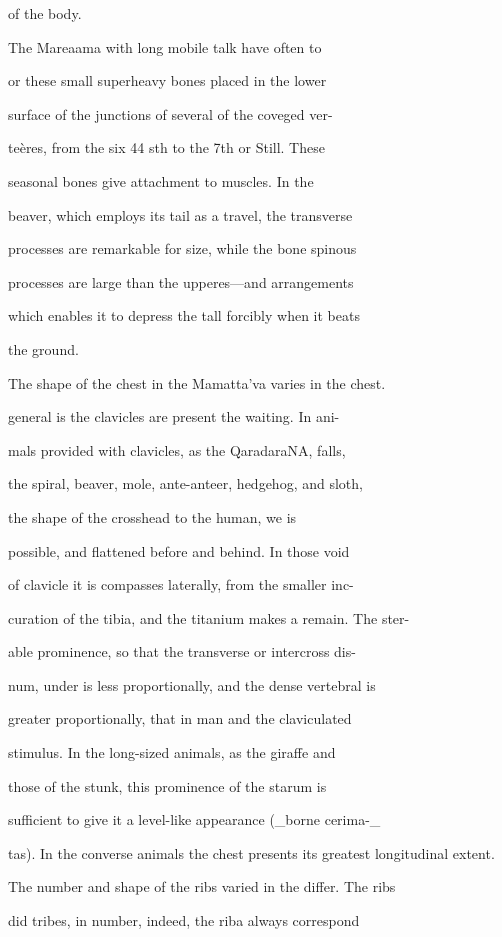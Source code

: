 \documentclass{article}
\begin{document}
of the body.

The Mareaama with long mobile talk have often to

or these small superheavy bones placed in the lower

surface of the junctions of several of the coveged ver-

teères, from the six 44 sth to the 7th or Still. These

seasonal bones give attachment to muscles. In the

beaver, which employs its tail as a travel, the transverse

processes are remarkable for size, while the bone spinous

processes are large than the upperes—and arrangements

which enables it to depress the tall forcibly when it beats

the ground.

The shape of the chest in the Mamatta’va varies in the chest.

general is the clavicles are present the waiting. In ani-

mals provided with clavicles, as the QaradaraNA, falls,

the spiral, beaver, mole, ante-anteer, hedgehog, and sloth,

the shape of the crosshead to the human, we is

possible, and flattened before and behind. In those void

of clavicle it is compasses laterally, from the smaller inc-

curation of the tibia, and the titanium makes a remain. The ster-

able prominence, so that the transverse or intercross dis-

num, under is less proportionally, and the dense vertebral is

greater proportionally, that in man and the claviculated

stimulus. In the long-sized animals, as the giraffe and

those of the stunk, this prominence of the starum is

sufficient to give it a level-like appearance (\_borne cerima-\_

tas). In the converse animals the chest presents its greatest longitudinal extent.

The number and shape of the ribs varied in the differ. The ribs

did tribes, in number, indeed, the riba always correspond
\end{document}
